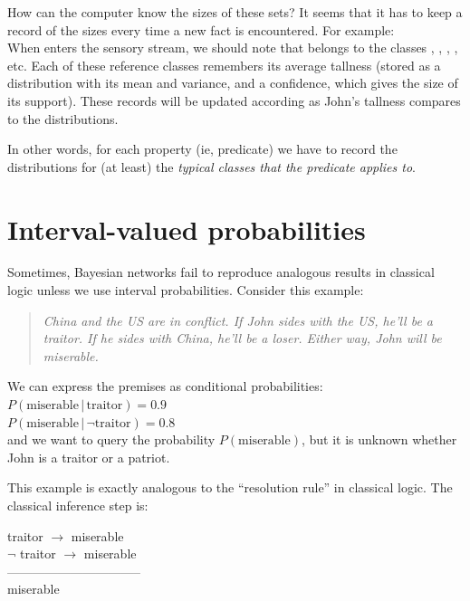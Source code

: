 How can the computer know the sizes of these sets?  It seems that it has to keep a record of the sizes every time a new fact is encountered.  For example:\\
When  enters the sensory stream, we should note that  belongs to the classes , , , , etc.  Each of these reference classes remembers its average tallness (stored as a distribution with its mean and variance, and a confidence, which gives the size of its support).  These records will be updated according as John's tallness compares to the distributions.

In other words, for each property (ie, predicate) we have to record the distributions for (at least) the \textit{typical classes that the predicate applies to}.

\section{Interval-valued probabilities}
\label{sec:intervalP}

Sometimes, Bayesian networks fail to reproduce analogous results in classical logic unless we use interval probabilities.  Consider this example:
\begin{quote}
\emph{China and the US are in conflict. If John sides with the US, he'll be a traitor. If he sides with China, he'll be a loser. Either way, John will be miserable.}
\end{quote}

We can express the premises as conditional probabilities:\\
\hspace*{1cm} $P(\mbox{miserable} \,|\, \mbox{traitor} ) = 0.9$ \\
\hspace*{1cm} $P(\mbox{miserable} \,|\, \neg\mbox{traitor} ) = 0.8$ \\
and we want to query the probability $P(\mbox{miserable})$, but it is unknown whether John is a traitor or a patriot.

This example is exactly analogous to the ``resolution rule'' in classical logic.  The classical inference step is:

\hspace*{1cm} traitor $\rightarrow$ miserable\\
\hspace*{1cm} $\neg$ traitor $\rightarrow$ miserable\\
\hspace*{1cm} --------------------------------\\
\hspace*{1cm} miserable

